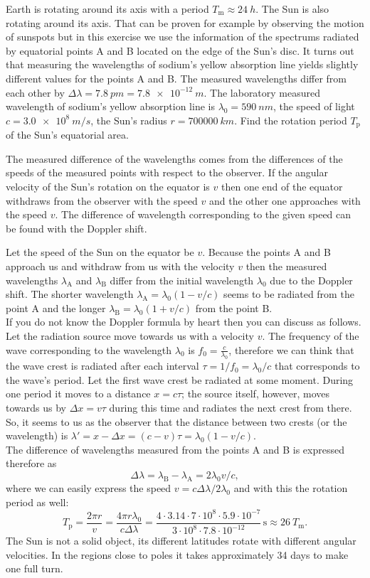 {\ifEngStatement
Earth is rotating around its axis with a period $T_\text{m}\approx\SI{24}{h}$. The Sun is also rotating around its axis. That can be proven for example by observing the motion of sunspots but in this exercise we use the information of the spectrums radiated by equatorial points A and B located on the edge of the Sun’s disc. It turns out that measuring the wavelengths of sodium’s yellow absorption line yields slightly different values for the points A and B. The measured wavelengths differ from each other by $\Delta \lambda = \SI{7.8}{pm}=\SI{7.8e-12}{m}$. The laboratory measured wavelength of sodium’s yellow absorption line is $\lambda_0=\SI{590}{nm}$, the speed of light $c=\SI{3.0e8}{m/s}$, the Sun’s radius $r=\SI{700000}{km}$. Find the rotation period $T_\text{p}$ of the Sun’s equatorial area.
\fi


\ifEngHint
The measured difference of the wavelengths comes from the differences of the speeds of the measured points with respect to the observer. If the angular velocity of the Sun’s rotation on the equator is $v$ then one end of the equator withdraws from the observer with the speed $v$ and the other one approaches with the speed $v$. The difference of wavelength corresponding to the given speed can be found with the Doppler shift.
\fi


\ifEngSolution
Let the speed of the Sun on the equator be $v$. Because the points A and B approach us and withdraw from us with the velocity $v$ then the measured wavelengths $\lambda_\text{A}$ and $\lambda_\text{B}$ differ from the initial wavelength $\lambda_0$ due to the Doppler shift. The shorter wavelength $\lambda_\text{A}=\lambda_0(1-v/c)$ seems to be radiated from the point A and the longer $\lambda_\text{B}=\lambda_0(1+v/c)$ from the point B.\\
If you do not know the Doppler formula by heart then you can discuss as follows. Let the radiation source move towards us with a velocity $v$. The frequency of the wave corresponding to the wavelength $\lambda_0$ is $f_0=\frac{c}{\lambda_0}$, therefore we can think that the wave crest is radiated after each interval $\tau = 1/f_0 = \lambda_0/c$ that corresponds to the wave’s period. Let the first wave crest be radiated at some moment. During one period it moves to a distance $x=c\tau$; the source itself, however, moves towards us by $\Delta x = v\tau$ during this time and radiates the next crest from there. So, it seems to us as the observer that the distance between two crests (or the wavelength) is $\lambda'=x-\Delta x=(c-v)\tau = \lambda_0(1-v/c)$.\\
The difference of wavelengths measured from the points A and B is expressed therefore as
\[
\Delta\lambda = \lambda_\text{B}-\lambda_\text{A} = 2\lambda_0 v/c,
\]
where we can easily express the speed $v=c\Delta\lambda/2\lambda_0$ and with this the rotation period as well:
\[
T_\text{p}=\frac{2\pi r}{v}=\frac{4 \pi r \lambda_0}{c\Delta \lambda}=
\frac{4 \cdot 3.14 \cdot 7\cdot 10^8 \cdot 5.9 \cdot 10^{-7}}{3\cdot 10^8\cdot 7.8\cdot 10^{-12}}\,\text{s}\approx \SI{26}{\textit{T}_\text{m}}.
\]
The Sun is not a solid object, its different latitudes rotate with different angular velocities. In the regions close to poles it takes approximately 34 days to make one full turn.
\fi
}